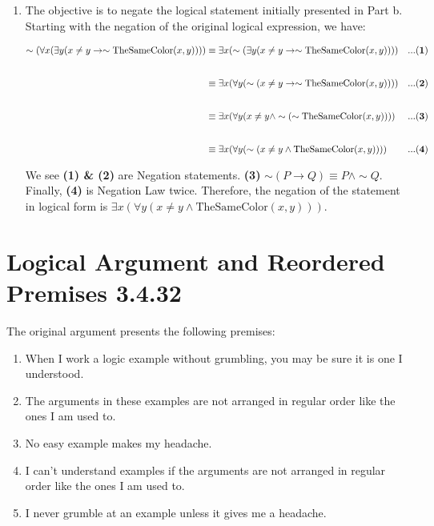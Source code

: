\documentclass[12pt]{article}
\begin{document}
\begin{enumerate}
    \item[  ] The objective is to negate the logical statement initially presented in Part b. Starting with the negation of the original logical expression, we have:
    
    \begin{align*}
        \sim (\forall x (\exists y (x \neq y \rightarrow \sim \text{TheSameColor}(x,y)))) &\equiv \exists x (\sim (\exists y (x \neq y \rightarrow \sim \text{TheSameColor}(x,y)))) && {\bf{...(1)}} \\[2em]
        &\equiv \exists x (\forall y (\sim (x \neq y \rightarrow \sim \text{TheSameColor}(x,y)))) &&  {\bf{...(2)}} \\[2em]
        &\equiv \exists x (\forall y (x \neq y \land \sim (\sim \text{TheSameColor}(x,y)))) &&  {\bf{...(3)}} \\[2em]
        &\equiv \exists x (\forall y (\sim (x \neq y \land \text{TheSameColor}(x,y)))) &&  {\bf{...(4)}}
    \end{align*}
    
    We see  {\bf{(1) \& (2)}} are Negation statements. {\bf{(3)}} \( \sim (P \rightarrow Q) \equiv P \land \sim Q\). Finally, {\bf{(4)}} is Negation Law twice. Therefore, the negation of the statement in logical form is \(\exists x (\forall y (x \neq y \land \text{TheSameColor}(x,y)))\).
\end{enumerate}

\section{Logical Argument and Reordered Premises 3.4.32}

The original argument presents the following premises:

\begin{enumerate}
    \item When I work a logic example without grumbling, you may be sure it is one I understood.
    \item The arguments in these examples are not arranged in regular order like the ones I am used to.
    \item No easy example makes my headache.
    \item I can't understand examples if the arguments are not arranged in regular order like the ones I am used to.
    \item I never grumble at an example unless it gives me a headache.
\end{enumerate}
\end{document}
